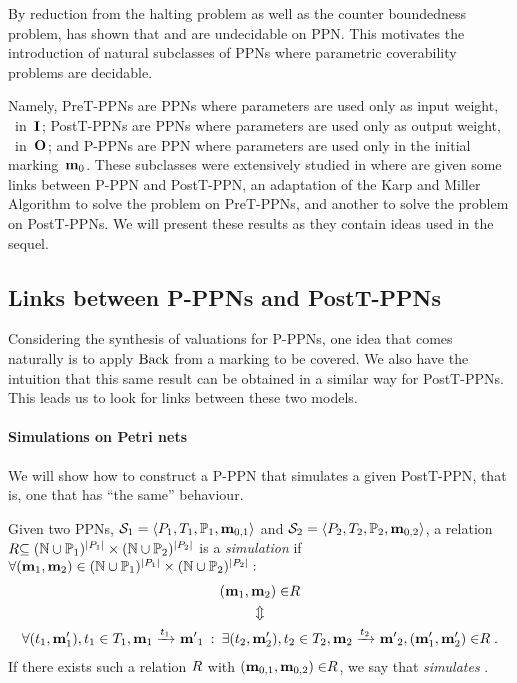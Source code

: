 By reduction from the halting problem as well as the counter boundedness problem, \cite{David17} has shown that \Ucov and \Ecov are undecidable on \ac{PPN}.
This motivates the introduction of natural subclasses of \acp{PPN} where parametric coverability problems are decidable.

Namely,
PreT-\acp{PPN} are \acp{PPN} where parameters are used only as input weight, \ie~in~$\inm$;
PostT-\acp{PPN} are \acp{PPN} where parameters are used only as output weight, \ie~in~$\outm$;
and P-\acp{PPN} are \ac{PPN} where parameters are used only in the initial marking~$\mathbf{m}_0$.
These subclasses were extensively studied in \cite{David17} where are given
some links between P-\ac{PPN} and PostT-\ac{PPN},
an adaptation of the Karp and Miller Algorithm to solve the \Ucov problem on PreT-\acp{PPN},
and another to solve the \Ecov problem on PostT-\acp{PPN}.
We will present these results as they contain ideas used in the sequel.

\subsection{Links between P-\acp{PPN} and PostT-\acp{PPN}}
\label{sec:p-ppn-and-postt-ppn}

Considering the synthesis of valuations for P-\acp{PPN}, one idea that comes naturally is to apply $\operatorname{Back}$ from a marking to be covered.
We also have the intuition that this same result can be obtained in a similar way for PostT-\acp{PPN}.
This leads us to look for links between these two models.

\paragraph{Simulations on Petri nets}
\label{sec:postt-ppn-to-p-ppn}

We will show how to construct a P-\ac{PPN} that simulates a given PostT-\ac{PPN}, that is, one that has ``the same'' behaviour.

\begin{defi}
  Given two \acp{PPN}, $\defPPN[1]$ and $\defPPN[2]$, a relation $\mathrel{R} \subseteq (\mathbb{N} \cup  \mathbb{P}_1)^{\left|P_1\right|} \times (\mathbb{N} \cup  \mathbb{P}_2)^{\left|P_2\right|}$ is a \emph{simulation} if $\forall (\mathbf{m}_1, \mathbf{m}_2) \in (\mathbb{N} \cup  \mathbb{P}_1)^{\left|P_1\right|} \times (\mathbb{N} \cup  \mathbb{P}_2)^{\left|P_2\right|} : $
  \begin{gather*}
    (\mathbf{m}_1, \mathbf{m}_2) \in \mathrel{R} \\
    \Updownarrow\\
    \forall (t_1,\mathbf{m}'_1), t_1 \in T_1, \mathbf{m}_1 \xrightarrow{t_1}_{} \mathbf{m'}_1 \>:\>
    \exists (t_2,\mathbf{m}'_2), t_2 \in T_2, \mathbf{m}_2 \xrightarrow{t_2}_{} \mathbf{m'}_2, (\mathbf{m}'_1, \mathbf{m}'_2) \in \mathrel{R}.
  \end{gather*}
  If there exists such a relation $\mathrel{R}$ with $(\mathbf{m}_{0,1}, \mathbf{m}_{0,2}) \in \mathrel{R}$, we say that \namePPN[2] \emph{simulates} \namePPN[1].
\end{defi}

